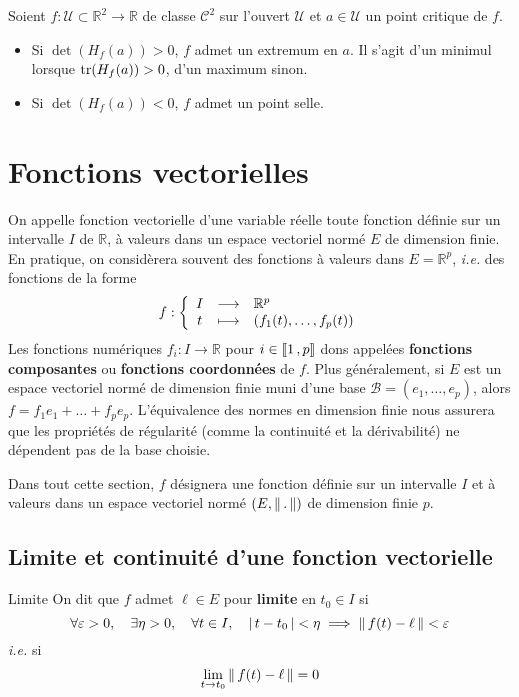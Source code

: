     \begin{coro}{}{}
        Soient $f : \mathcal{U} \subset \mathbb{R}^2 \to \mathbb{R}$ de classe $\mathcal{C}^2$ sur l’ouvert $\mathcal{U}$ et $a \in \mathcal{U}$ un point critique de $f$.
        \begin{itemize}
            \item Si $\det(H_f(a)) > 0$, $f$ admet un extremum en $a$. Il s’agit d’un minimul lorsque $\operatorname{tr}(H_f(a)) > 0$, d’un maximum sinon.
            \item Si $\det(H_f(a)) < 0$, $f$ admet un point selle.
        \end{itemize}
    \end{coro}

\newpage

\section{Fonctions vectorielles}

    On appelle fonction vectorielle d’une variable réelle toute fonction définie sur un intervalle $I$ de $\mathbb{R}$, à valeurs dans un espace vectoriel normé $E$ de dimension finie. En pratique, on considèrera souvent des fonctions à valeurs dans $E = \mathbb{R}^p$, \textit{i.e.} des fonctions de la forme 
    \[ \fonction{f}{I}{\mathbb{R}^p}{t}{\left( f_1(t),\ldots,f_p(t) \right)} \]
    Les fonctions numériques $f_i : I \to \mathbb{R}$ pour $i \in \left\llbracket 1 \, , p \right\rrbracket$ dons appelées \textbf{fonctions composantes} ou \textbf{fonctions coordonnées} de $f$. Plus généralement, si $E$ est un espace vectoriel normé de dimension finie muni d’une base $\mathcal{B} = (e_1,\ldots,e_p)$, alors $f = f_1e_1 + \ldots + f_p e_p$. L’équivalence des normes en dimension finie nous assurera que les propriétés de régularité (comme la continuité et la dérivabilité) ne dépendent pas de la base choisie.

    Dans tout cette section, $f$ désignera une fonction définie sur un intervalle $I$ et à valeurs dans un espace vectoriel normé $\left(E, \left\lVert \,. \, \right\rVert\right)$ de dimension finie $p$.

\subsection{Limite et continuité d’une fonction vectorielle}

    \begin{defi}{Limite}{}
        On dit que $f$ admet $\ell \in E$ pour \textbf{limite} en $t_0 \in I$ si 
        \[ \forall \varepsilon > 0, \quad \exists \eta > 0, \quad \forall t \in I, \quad \left\lvert \,t - t_0 \, \right\rvert < \eta \implies \left\lVert \,f(t) - \ell \, \right\rVert < \varepsilon \]
        \textit{i.e.} si 
        \[ \lim_{t \to t_0} \left\lVert \,f(t) - \ell \, \right\rVert = 0 \]
    \end{defi}

